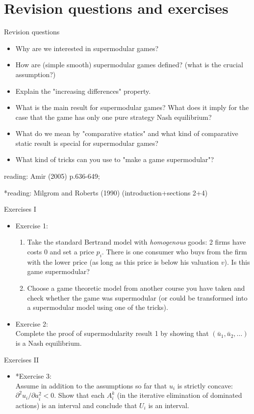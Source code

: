 \documentclass[bigger]{beamer}
\begin{document}
\section{Revision questions and exercises}
\label{sec:orgheadline23}

\begin{frame}[label={sec:orgheadline20}]{Revision questions}
\begin{itemize}
\item Why are we interested in supermodular games?
\item How are (simple smooth) supermodular games defined? (what is the crucial assumption?)
\item Explain the "increasing differences" property.
\item What is the main result for supermodular games? What does it imply for the case that the game has only one pure strategy Nash equilibrium?
\item What do we mean by "comparative statics" and what kind of comparative static result is special for supermodular games?
\item What kind of tricks can you use to "make a game supermodular"?
\end{itemize}

reading: Amir (2005) p.636-649; 

*reading: Milgrom and Roberts (1990) (introduction+sections 2+4)
\end{frame}

\begin{frame}[label={sec:orgheadline21}]{Exercises I}
\begin{itemize}
\item Exercise 1:
\begin{enumerate}
\item Take the standard Bertrand model with \emph{homogenous} goods: 2 firms have costs 0 and set a price \(p_i\). There is one consumer who buys from the firm with the lower price (as long as this price is below his valuation \(v\)). Is this game supermodular?
\item Choose a game theoretic model from another course you have taken and check whether the game was supermodular (or could be transformed into a supermodular model using one of the tricks).
\end{enumerate}
\item Exercise 2:\\
Complete the proof of supermodularity result 1 by showing that \((\bar u_1,\bar u_2,\dots)\) is a Nash equilibrium.
\end{itemize}
\end{frame}

\begin{frame}[label={sec:orgheadline22}]{Exercises II}
\begin{itemize}
\item *Exercise 3:\\
Assume in addition to the assumptions so far that \(u_i\) is strictly concave: \(\partial^2 u_i/\partial a_i^2<0\). Show that each \(A_i^k\) (in the iterative elimination of dominated actions) is an interval and conclude that \(U_i\) is an interval.
\end{itemize}
\end{frame}
\end{document}
